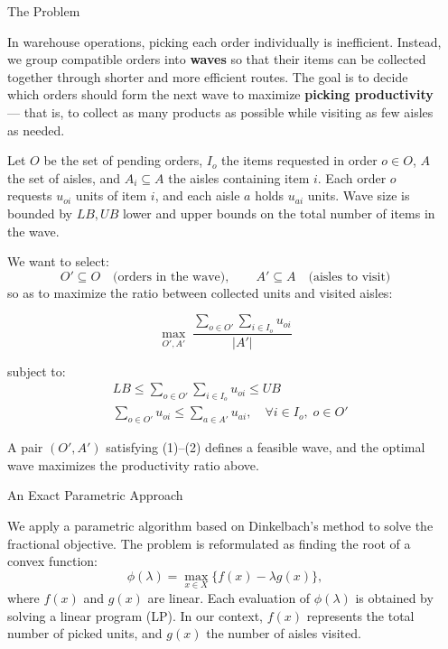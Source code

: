 \documentclass[final]{beamer}
\newlength{\sepwidth}
\newlength{\colwidth}
\newcommand{\separatorcolumn}{\begin{column}{\sepwidth}\end{column}}
\begin{document}
\begin{frame}[t]
\begin{columns}[t]
\separatorcolumn

\begin{column}{\colwidth}

  \begin{block}{The Problem}

    In warehouse operations, picking each order individually is inefficient. Instead, we group compatible orders into \textbf{waves} so that their items can be collected together through shorter and more efficient routes. The goal is to decide which orders should form the next wave to maximize \textbf{picking productivity} — that is, to collect as many products as possible while visiting as few aisles as needed.

Let $O$ be the set of pending orders, $I_o$ the items requested in order $o\in O$, 
$A$ the set of aisles, and $A_i\subseteq A$ the aisles containing item $i$. 
Each order $o$ requests $u_{oi}$ units of item $i$, and each aisle $a$ holds $u_{ai}$ units. 
Wave size is bounded by $LB, UB$ lower and upper bounds on the total number of items in the wave.


We want to select:
\[
O' \subseteq O \quad \text{(orders in the wave)}, \qquad
A' \subseteq A \quad \text{(aisles to visit)}
\]
so as to maximize the ratio between collected units and visited aisles:

\[
\max_{O',A'} \; \frac{\displaystyle\sum_{o \in O'} \sum_{i \in I_o} u_{oi}}{|A'|}
\]

subject to:
\begin{align}
    & LB \le \sum_{o \in O'} \sum_{i \in I_o} u_{oi} \le UB \tag{1}\\[3pt]
    &\sum_{o \in O'} u_{oi} \le \sum_{a \in A'} u_{ai}, \quad \forall i \in I_o, \; o \in O' \tag{2}
\end{align}

A pair $(O',A')$ satisfying (1)--(2) defines a feasible wave, and the optimal wave maximizes the productivity ratio above.
  \end{block}

\begin{block}{An Exact Parametric Approach}

We apply a parametric algorithm based on Dinkelbach’s method to solve the fractional objective. 
The problem is reformulated as finding the root of a convex function:
\[
\phi(\lambda) = \max_{x \in X} \{ f(x) - \lambda g(x) \},
\]
where $f(x)$ and $g(x)$ are linear. Each evaluation of $\phi(\lambda)$ is obtained by solving a linear program (LP). 
In our context, $f(x)$ represents the total number of picked units, and $g(x)$ the number of aisles visited.


\end{block}
\end{column}
\end{columns}
\end{frame}
\end{document}
